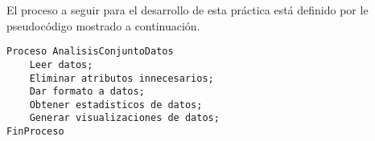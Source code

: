 El proceso a seguir para el desarrollo de esta práctica está definido por le pseudocódigo mostrado a continuación.

\begin{lstlisting}
Proceso AnalisisConjuntoDatos
	Leer datos;
	Eliminar atributos innecesarios;
	Dar formato a datos;
	Obtener estadisticos de datos;
	Generar visualizaciones de datos;
FinProceso
\end{lstlisting}